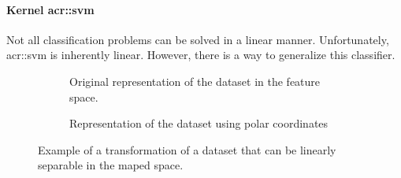             \paragraph{Kernel \acrshort*{acr::svm}}
                Not all classification problems can be solved in a linear manner.
                Unfortunately, \gls{acr::svm} is inherently linear.
                However, there is a way to generalize this classifier.\\

                \begin{figure}
                    \centering
                    \begin{subfigure}{.48\textwidth}
                        \centering
                        
                        \caption{
                            \label{fig::original_circles}
                            Original representation of the dataset in the feature space.
                        }
                    \end{subfigure}
                    \begin{subfigure}{.48\textwidth}
                        \centering
                        
                        \caption{
                            \label{fig::polar_circles}
                            Representation of the dataset using polar coordinates
                        }
                    \end{subfigure}
                    \caption{
                        \label{fig::circles_transformation}
                        Example of a transformation of a dataset that can be linearly separable in the maped space. 
                    }
                \end{figure}

